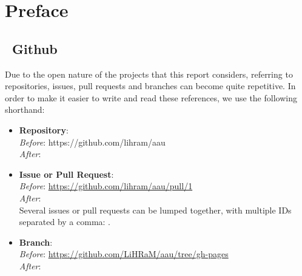 \chapter*{Preface}


\section*{\faGithub~Github}
Due to the open nature of the projects that this report considers, referring to repositories, issues, pull requests and branches can become quite repetitive.
In order to make it easier to write and read these references, we use the following shorthand:
\begin{itemize}
    \item{
          \textbf{Repository}: \\
          \textit{Before}: https://github.com/lihram/aau\\
          \textit{After}: 
          }
    \item{
          \textbf{Issue or Pull Request}: \\
          \textit{Before}: \url{https://github.com/lihram/aau/pull/1}\\
          \textit{After}: \\
          Several issues or pull requests can be lumped together, with multiple IDs separated by a comma: .
          }
    \item{
          \textbf{Branch}: \\
          \textit{Before}: \url{https://github.com/LiHRaM/aau/tree/gh-pages}\\
          \textit{After}: 
          }
\end{itemize}

\listoftodos